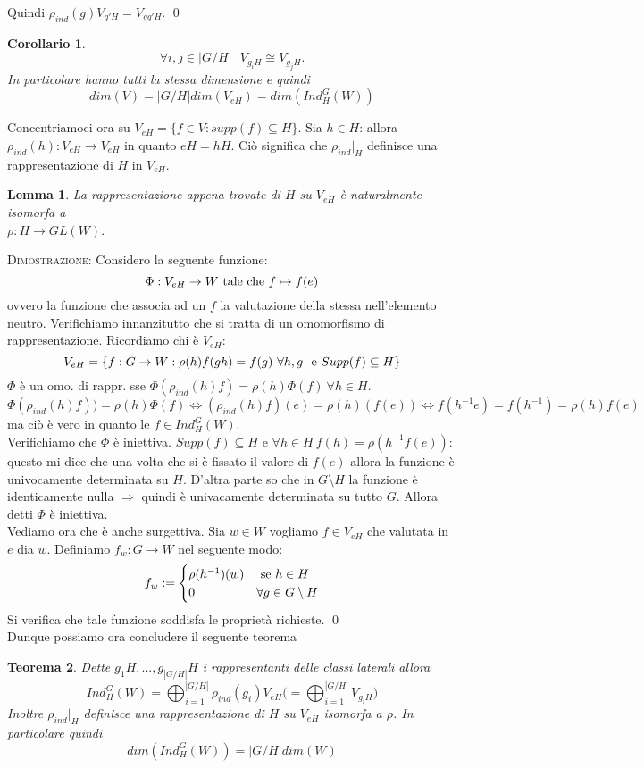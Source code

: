 \documentclass[11pt]{article}
\theoremstyle{plain}
\newtheorem{thm}{Teorema}[section]
\newtheorem{lemma}[thm]{Lemma}
\newtheorem*{cor}{Corollario}
\theoremstyle{definition}
\theoremstyle{remark}
\begin{document}
Quindi $\rho_{ind}(g)V_{g'H}=V_{gg'H}$. \qed
\\ 
\begin{cor}
\[\forall i,j\in |G/H|\ \ \ V_{g_iH}\cong V_{g_jH}.\]
In particolare hanno tutti la stessa dimensione e quindi
\[dim(V)=|G/H|dim(V_{eH})=dim(Ind_H^G(W))\]
\end{cor}
Concentriamoci ora su $V_{eH}=\{f\in V:supp(f)\subseteq H\}$. Sia $h\in H$: allora $\rho_{ind}(h):V_{eH}\rightarrow V_{eH}$ in quanto $eH=hH$. Ciò significa che $\rho_{ind}|_{H}$ definisce una rappresentazione di $H$ in $V_{eH}$.
\begin{lemma}
La rappresentazione appena trovate di $H$ su $V_{eH}$ è naturalmente isomorfa a\\ $\rho:H\rightarrow GL(W)$.
\end{lemma}
\textsc{Dimostrazione:} Considero la seguente funzione: 
\[\Phi:V_{eH}\rightarrow W\ \textup{tale che } f\mapsto f(e)\]
ovvero la funzione che associa ad un $f$ la valutazione della stessa nell'elemento neutro. Verifichiamo innanzitutto che si tratta di un omomorfismo di rappresentazione. Ricordiamo chi è $V_{eH}$:
\[V_{eH}=\{f:G\rightarrow W: \rho(h)f(gh)=f(g)\ \forall h,g\ \ \textup{e } Supp(f)\subseteq H\}\]
$\Phi$ è un omo. di rappr. sse $\Phi(\rho_{ind}(h)f)=\rho(h)\Phi(f)\ \forall h\in H$.
\[\Phi(\rho_{ind}(h)f))=\rho(h)\Phi(f) \Leftrightarrow (\rho_{ind}(h)f)(e)=\rho(h)(f(e))\Leftrightarrow f(h^{-1}e)=f(h^{-1})=\rho(h)f(e)\]
ma ciò è vero in quanto le $f\in Ind_H^G(W)$. \\
Verifichiamo che $\Phi$ è iniettiva. $Supp(f)\subseteq H$ e $\forall h\in H\ f(h)=\rho(h^{-1}f(e))$: questo mi dice che una volta che si è fissato il valore di $f(e)$ allora la funzione è univocamente determinata su $H$. D'altra parte so che in $G\setminus H$ la funzione è identicamente nulla $\Rightarrow$ quindi è univacamente determinata su tutto $G$. Allora detti $\Phi$ è iniettiva.\\
Vediamo ora che è anche surgettiva. Sia $w\in W$ vogliamo $f\in V_{eH}$ che valutata in $e$ dia $w$. Definiamo $f_w:G\rightarrow W$ nel seguente modo: 
\[f_w:=\begin{cases}
\rho(h^{-1})(w)& \textup{ se } h\in H\\
0& \forall g\in G\setminus H
\end{cases}\]
Si verifica che tale funzione soddisfa le proprietà richieste. \qed \\
Dunque possiamo ora concludere il seguente teorema
\begin{thm} Dette $g_1H,...,g_{|G/H|}H$ i rappresentanti delle classi laterali allora 
\[Ind_H^G(W)=\bigoplus_{i=1}^{|G/H|}\rho_{ind}(g_i)V_{eH}\bigl( =\bigoplus_{i=1}^{|G/H|} V_{g_iH}\bigr) \]
Inoltre $\rho_{ind}|_H$ definisce una rappresentazione di $H$ su $V_{eH}$ isomorfa a $\rho$. In particolare quindi 
\[dim(Ind_H^G(W))=|G/H|dim(W)\] 
\end{thm}
\end{document}
